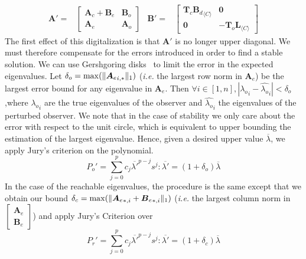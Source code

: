 \documentclass[sigconf]{llncs}
\DeclarePairedDelimiter\norm{\lVert}{\rVert}
\newcommand{\mat}[1]{\boldsymbol{#1}}
\begin{document}
{\setlength{\abovedisplayskip}{0pt}
\begin{align*}
\mat{A}'=&\left [\begin{array}{cc}\mat{A}_{c}+\mat{B}_{e}&\mat{B}_{o}\\ \mat{A}_{e}&\mat{A}_{o}\end{array}\right]&
\mat{B}'=&\left[\begin{array}{cc}\mat{T}_c{\mat{B}_d}_{\langle C \rangle}&\mat{0}\\\mat{0}&-\mat{T}_o\mat{L}_{\langle C \rangle}\end{array}\right]
\end{align*}
}
The first effect of this digitalization is that $\mat{A}'$ is no longer upper
diagonal.  We must therefore compensate for the errors introduced in order
to find a stable solution.  We can use Gershgoring disks~\cite{van1996matrix} to limit the error
in the expected eigenvalues.  Let $\delta_o=\max(\norm{{\mat{A}_e}_{i,*}}_1)$
(\emph{i.e.} the largest row norm in $\mat{A}_e$) be the largest error bound
for any eigenvalue in $\mat{A}_e$.  Then $\forall i \in [1, n],
|{\lambda_o}_{i}-\hat{\lambda_o}_{i}|<\delta_o$,where ${\lambda_o}_{i}$ are the
true eigenvalues of the observer and $\hat{\lambda_o}_{i}$ the eigenvalues of
the perturbed observer.  We note that in the case of stability we only care
about the error with respect to the unit circle, which is equivalent to
upper bounding the estimation of the largest eigenvalue.  Hence, given a
desired upper value $\overline{\lambda}$, we apply Jury's criterion on the
polynomial.
%
\begin{equation}
P_o'=\sum_{j=0}^p c_j\overline{\lambda'}^{p-j}s^j : \overline{\lambda'}=(1+\delta_o)\overline{\lambda}
\end{equation}
%
In the case of the reachable eigenvalues, the procedure is the same except
that we obtain our bound $\delta_c=\max(\norm{{\mat{A}_e}_{*,i}+{\mat{B}_e}_{*,i}}_1)$
(\emph{i.e.} the largest column norm in $ \left[\begin{array}{c}\mat{A}_e\\ \mat{B}_e\end{array}\right]$) and
apply Jury's Criterion over
%
\begin{equation}
P_r'=\sum_{j=0}^p c_j\overline{\lambda'}^{p-j}s^j : \overline{\lambda'}=(1+\delta_c)\overline{\lambda}
\end{equation}

\end{document}
